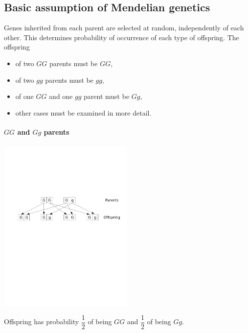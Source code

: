\subsection{Basic assumption of Mendelian genetics}
Genes inherited from each parent are selected at random, independently of each other.
This determines probability
of occurrence of each type of offspring. The offspring
\begin{itemize}
\item of two $GG$ parents must be $GG$, 
\item of two $gg$ parents must be $gg$,
\item of one $GG$ and one $gg$ parent must be $Gg$,
\item other cases must be examined in more detail.
\end{itemize}


\paragraph{$GG$ and $Gg$ parents}
\begin{center}
\includegraphics[width=0.5\textwidth]
{../figs_08_genetics/dominant_hybrid}
\end{center}
\vskip0.2cm
Offspring has probability $\dfrac 12$ of being $GG$ and $\dfrac 12$ of being $Gg$.

